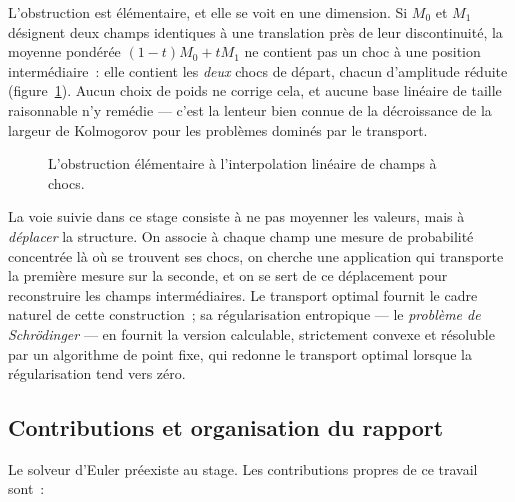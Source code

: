 \documentclass[11pt,a4paper]{article}
\begin{document}
L'obstruction est élémentaire, et elle se voit en une dimension. Si $M_0$ et $M_1$
désignent deux champs identiques à une translation près de leur discontinuité, la
moyenne pondérée $(1-t)M_0 + tM_1$ ne contient pas un choc à une position intermédiaire~:
elle contient les \emph{deux} chocs de départ, chacun d'amplitude réduite
(figure~\ref{fig:creneaux}). Aucun choix de poids ne corrige cela, et aucune base
linéaire de taille raisonnable n'y remédie --- c'est la lenteur bien connue de la
décroissance de la largeur de Kolmogorov pour les problèmes dominés par le transport.

\begin{figure}[htbp]
  \centering
  \caption{L'obstruction élémentaire à l'interpolation linéaire de champs à chocs.}
  \label{fig:creneaux}
\end{figure}

La voie suivie dans ce stage consiste à ne pas moyenner les valeurs, mais à
\emph{déplacer} la structure. On associe à chaque champ une mesure de probabilité
concentrée là où se trouvent ses chocs, on cherche une application qui transporte la
première mesure sur la seconde, et on se sert de ce déplacement pour reconstruire les
champs intermédiaires. Le transport optimal fournit le cadre naturel de cette
construction~; sa régularisation entropique --- le \emph{problème de Schrödinger} --- en
fournit la version calculable, strictement convexe et résoluble par un algorithme de
point fixe, qui redonne le transport optimal lorsque la régularisation tend vers zéro.

\subsection{Contributions et organisation du rapport}

Le solveur d'Euler préexiste au stage. Les contributions propres de ce travail sont~:
\end{document}
